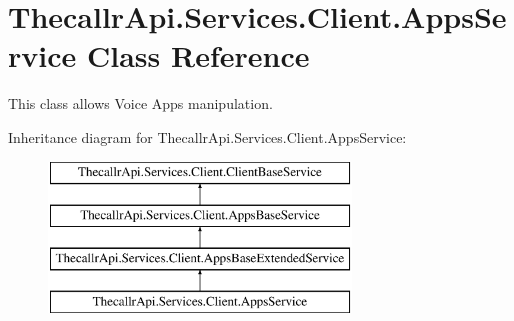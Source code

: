 \hypertarget{class_thecallr_api_1_1_services_1_1_client_1_1_apps_service}{\section{Thecallr\+Api.\+Services.\+Client.\+Apps\+Service Class Reference}
\label{class_thecallr_api_1_1_services_1_1_client_1_1_apps_service}
}


This class allows Voice Apps manipulation.  


Inheritance diagram for Thecallr\+Api.\+Services.\+Client.\+Apps\+Service\+:\begin{figure}[H]
\begin{center}
\leavevmode
\includegraphics[height=4.000000cm]{class_thecallr_api_1_1_services_1_1_client_1_1_apps_service}
\end{center}
\end{figure}
